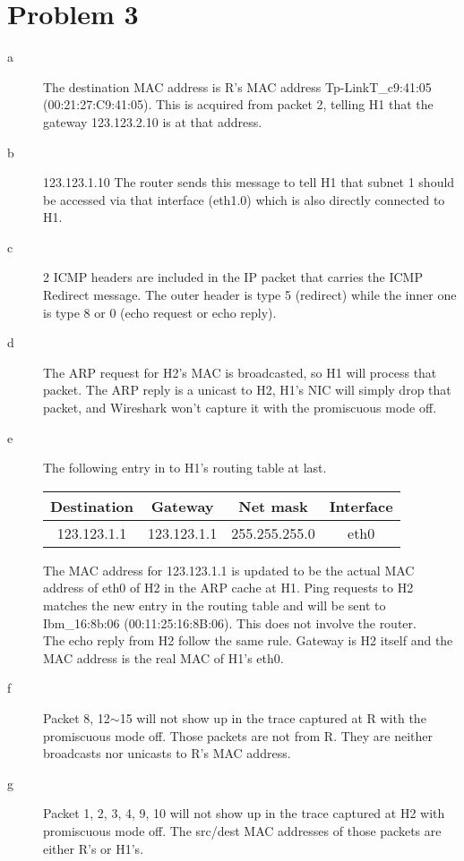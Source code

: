 \documentclass[a4paper]{article}
\begin{document}

\section{Problem 3} %
\label{sec:problem_3}
\begin{description}
	\item[a] The destination MAC address is R's MAC address Tp-LinkT\_c9:41:05 (00:21:27:C9:41:05). This is acquired from packet 2, telling H1 that the gateway 123.123.2.10 is at that address.
	\item[b] 123.123.1.10 The router sends this message to tell H1 that subnet 1 should be accessed via that interface (eth1.0) which is also directly connected to H1.
	\item[c] 2 ICMP headers are included in the IP packet that carries the ICMP Redirect message. The outer header is type 5 (redirect) while the inner one is type 8 or 0 (echo request or echo reply).
	\item[d] The ARP request for H2's MAC is broadcasted, so H1 will process that packet. The ARP reply is a unicast to H2, H1's NIC will simply drop that packet, and Wireshark won't capture it with the promiscuous mode off.
	\item[e] The following entry in to H1's routing table at last.\\
	\begin{center}
	\begin{tabular}{cccc}
	\hline
	Destination & Gateway & Net mask & Interface\\
	\hline
	123.123.1.1 & 123.123.1.1 & 255.255.255.0 & eth0\\
	\hline
	\end{tabular}
	\end{center}
	The MAC address for 123.123.1.1 is updated to be the actual MAC address of eth0 of H2 in the ARP cache at H1. Ping requests to H2 matches the new entry in the routing table and will be sent to Ibm\_16:8b:06 (00:11:25:16:8B:06). This does not involve the router.\\
	The echo reply from H2 follow the same rule. Gateway is H2 itself and the MAC address is the real MAC of H1's eth0.
	\item[f] Packet 8, 12$\sim$15 will not show up in the trace captured at R with the promiscuous mode off. Those packets are not from R. They are neither broadcasts nor unicasts to R's MAC address.
	\item[g] Packet 1, 2, 3, 4, 9, 10 will not show up in the trace captured at H2 with promiscuous mode off. The src/dest MAC addresses of those packets are either R's or H1's.

\end{description}
\end{document}
